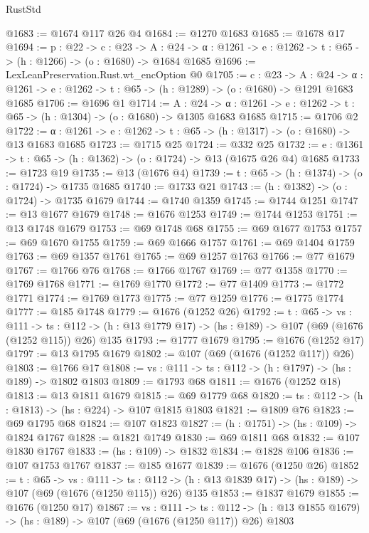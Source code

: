 \begin{lexlean}{RustStd}
\begin{coremodule}
{\begin{coremodule}
{{{@1683 := @1674 @117 @26 @4
@1684 := @1270 @1683
@1685 := @1678 @17
@1694 := {p : @22} ->
  {c : @23} ->
  {A : @24} -> {α : @1261} -> {e : @1262} -> {t : @65} -> (h : @1266) -> (o : @1680) -> @1684 @1685
@1696 := LexLeanPreservation.Rust.wt_encOption @0
@1705 := {c : @23} ->
  {A : @24} ->
  {α : @1261} -> {e : @1262} -> {t : @65} -> (h : @1289) -> (o : @1680) -> @1291 @1683 @1685
@1706 := @1696 @1
@1714 := {A : @24} ->
  {α : @1261} -> {e : @1262} -> {t : @65} -> (h : @1304) -> (o : @1680) -> @1305 @1683 @1685
@1715 := @1706 @2
@1722 := {α : @1261} -> {e : @1262} -> {t : @65} -> (h : @1317) -> (o : @1680) -> @13 @1683 @1685
@1723 := @1715 @25
@1724 := @332 @25
@1732 := {e : @1361} -> {t : @65} -> (h : @1362) -> (o : @1724) -> @13 (@1675 @26 @4) @1685
@1733 := @1723 @19
@1735 := @13 (@1676 @4)
@1739 := {t : @65} -> (h : @1374) -> (o : @1724) -> @1735 @1685
@1740 := @1733 @21
@1743 := (h : @1382) -> (o : @1724) -> @1735 @1679
@1744 := @1740 @1359
@1745 := @1744 @1251
@1747 := @13 @1677 @1679
@1748 := @1676 @1253
@1749 := @1744 @1253
@1751 := @13 @1748 @1679
@1753 := @69 @1748 @68
@1755 := @69 @1677 @1753
@1757 := @69 @1670 @1755
@1759 := @69 @1666 @1757
@1761 := @69 @1404 @1759
@1763 := @69 @1357 @1761
@1765 := @69 @1257 @1763
@1766 := @77 @1679
@1767 := @1766 @76
@1768 := @1766 @1767
@1769 := @77 @1358
@1770 := @1769 @1768
@1771 := @1769 @1770
@1772 := @77 @1409
@1773 := @1772 @1771
@1774 := @1769 @1773
@1775 := @77 @1259
@1776 := @1775 @1774
@1777 := @185 @1748
@1779 := @1676 (@1252 @26)
@1792 := {t : @65} ->
  {vs : @111} ->
  {ts : @112} -> (h : @13 @1779 @17) -> (hs : @189) -> @107 (@69 (@1676 (@1252 @115)) @26) @135
@1793 := @1777 @1679
@1795 := @1676 (@1252 @17)
@1797 := @13 @1795 @1679
@1802 := @107 (@69 (@1676 (@1252 @117)) @26)
@1803 := @1766 @17
@1808 := {vs : @111} -> {ts : @112} -> (h : @1797) -> (hs : @189) -> @1802 @1803
@1809 := @1793 @68
@1811 := @1676 (@1252 @18)
@1813 := @13 @1811 @1679
@1815 := @69 @1779 @68
@1820 := {ts : @112} -> (h : @1813) -> (hs : @224) -> @107 @1815 @1803
@1821 := @1809 @76
@1823 := @69 @1795 @68
@1824 := @107 @1823
@1827 := (h : @1751) -> (hs : @109) -> @1824 @1767
@1828 := @1821 @1749
@1830 := @69 @1811 @68
@1832 := @107 @1830 @1767
@1833 := (hs : @109) -> @1832
@1834 := @1828 @106
@1836 := @107 @1753 @1767
@1837 := @185 @1677
@1839 := @1676 (@1250 @26)
@1852 := {t : @65} ->
  {vs : @111} ->
  {ts : @112} -> (h : @13 @1839 @17) -> (hs : @189) -> @107 (@69 (@1676 (@1250 @115)) @26) @135
@1853 := @1837 @1679
@1855 := @1676 (@1250 @17)
@1867 := {vs : @111} ->
  {ts : @112} -> (h : @13 @1855 @1679) -> (hs : @189) -> @107 (@69 (@1676 (@1250 @117)) @26) @1803
}}}
\end{coremodule}}
\end{coremodule}
\end{lexlean}

